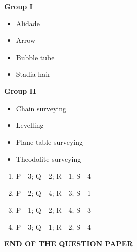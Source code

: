 \documentclass[journal,12pt,onecolumn]{IEEEtran}
\theoremstyle{remark}
\begin{document}
\begin{enumerate}
\textbf{Group I}
\begin{itemize}
\item[P.] Alidade
\item[Q.] Arrow
\item[R.] Bubble tube
\item[S.] Stadia hair
\end{itemize}

\textbf{Group II}
\begin{itemize}
\item[1.] Chain surveying
\item[2.] Levelling
\item[3.] Plane table surveying
\item[4.] Theodolite surveying
\end{itemize}

\begin{multicols}{4}
\begin{enumerate}
\item P - 3; Q - 2; R - 1; S - 4
\item P - 2; Q - 4; R - 3; S - 1
\item P - 1; Q - 2; R - 4; S - 3
\item P - 3; Q - 1; R - 2; S - 4
\end{enumerate}
\end{multicols}



\end{enumerate}
\vspace{3 cm}
\begin{center}
    \textbf{END OF THE QUESTION PAPER}
\end{center}
\end{document}
